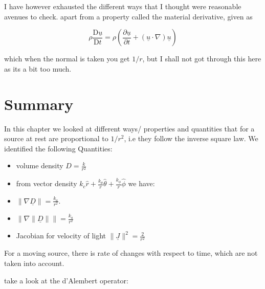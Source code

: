 I have however exhausted the different ways that I thought were reasonable avenues to check. apart from a property called the material derivative, given as

\begin{equation}
	\rho {\frac {\mathrm {D} \underline {u} }{\mathrm {D} t}}=\rho \left({\frac {\partial \underline {u} }{\partial t}}+(\underline {u} \cdot \nabla )\underline {u} \right)
\end{equation}

which when the normal is taken you get $1/r$, but I shall not got through this here as its a bit too much.






\section{Summary}

In this chapter we looked at different ways/ properties and quantities that for a source at rest are proportional to $1/r^2$, i.e they follow the inverse square law.
We identified the following Quantities:

\begin{itemize}
	\item volume density $D=\frac{k}{r^2}$
	\item from vector density $k_c \hat{r} + \frac{k_\theta}{r} \hat{\theta} + \frac{k_\phi}{r} \hat{\phi}$ we have:
	\item $\| \nabla \underline{D} \| = \frac{k_{a}}{r^2}$.
	\item $\Big\| \nabla \| \underline{D} \| \Big\| = \frac{k_{a}}{r^2}$
	\item Jacobian for velocity of light $\|\underline{J}\|^2 = \frac{2}{r^2}$
\end{itemize}

For a moving source, there is rate of changes with respect to time, which are not taken into account.

take a look at the d'Alembert operator:

